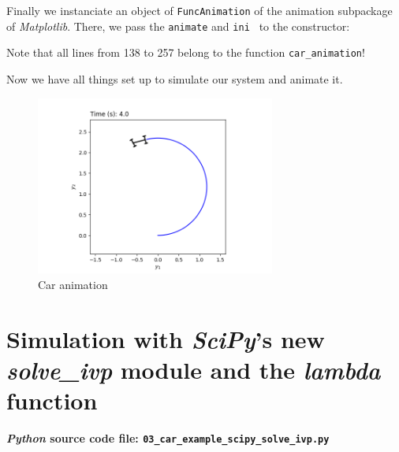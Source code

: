 \documentclass[a4paper,11pt,headings=standardclasses,parskip=half]{scrartcl}
\newcommand{\listcode}[3]{}
\newcommand{\listcodeanim}[2]{\listcode{#1}{#2}{../sim/02_car_example_animation.py}}
\newcommand{\py}{\emph{Python}\xspace}
\newcommand{\scipy}{\emph{SciPy}\xspace}
\newcommand{\mpl}{\emph{Matplotlib}\xspace}
\begin{document}
Finally we instanciate an object of \texttt{FuncAnimation} of the animation subpackage of \mpl. There, we pass the \texttt{animate} and \texttt{ini } to the constructor:
\listcodeanim{252}{258}

Note that all lines from 138 to 257 belong to the function \texttt{car\_animation}!

Now we have all things set up to simulate our system and animate it.
\listcodeanim{274}{277}

\begin{figure}[ht]
  \centering
  \includegraphics[width=0.7\textwidth]{img/animation}
  \caption{Car animation}
  \label{fig:animation}
\end{figure}
        



\section{Simulation with \scipy's new \emph{solve\_ivp} module and the \emph{lambda} function}\label{sec:ScipyLambda}

\textbf{\py source code file: \texttt{03\_car\_example\_scipy\_solve\_ivp.py}}
\end{document}
